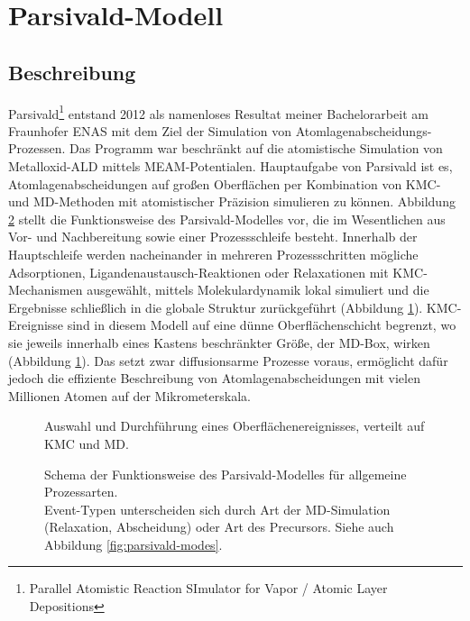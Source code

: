 \section{Parsivald-Modell}
\label{parsivald}


\subsection{Beschreibung}

Parsivald\footnote{Parallel Atomistic Reaction SImulator for Vapor / Atomic Layer Depositions} entstand 2012 als namenloses Resultat meiner Bachelorarbeit\cite{lorenz_entwicklung_2012} am Fraunhofer ENAS mit dem Ziel der Simulation von Atom\-lagen\-abscheidungs-Prozessen.
Das Programm war beschränkt auf die atomistische Simulation von Metall\-oxid-ALD mittels MEAM-Potentialen.
Hauptaufgabe von Parsivald ist es, Atomlagenabscheidungen auf großen Oberflächen per Kombination von KMC- und MD-Methoden mit atomistischer Präzision simulieren zu können.
Abbildung \ref{fig:parsivald-stephierarchy} stellt die Funktionsweise des Parsivald-Modelles vor, die im Wesentlichen aus Vor- und Nachbereitung sowie einer Prozessschleife besteht.
Innerhalb der Hauptschleife werden nacheinander in mehreren Prozessschritten mögliche Adsorptionen, Ligandenaustausch-Reaktionen oder Relaxationen mit KMC-Mechanismen ausgewählt, mittels Molekulardynamik lokal simuliert und die Ergebnisse schließlich in die globale Struktur zurückgeführt (Abbildung \ref{fig:parsivald-schema}).
KMC-Ereignisse sind in diesem Modell auf eine dünne Oberflächenschicht begrenzt, wo sie jeweils innerhalb eines Kastens beschränkter Größe, der MD-Box, wirken (Abbildung \ref{fig:parsivald-schema}).
Das setzt zwar diffusionsarme Prozesse voraus, ermöglicht dafür jedoch die effiziente Beschreibung von Atomlagenabscheidungen mit vielen Millionen Atomen auf der Mikrometerskala.

\begin{figure}
  \centering
  \def\svgwidth{\textwidth}
  
  \caption[Parsivald-Schema]{
    Auswahl und Durchführung eines Oberflächenereignisses, verteilt auf KMC und MD.
  }
  \label{fig:parsivald-schema}
\end{figure}

\begin{figure}
  \centering
  \def\svgwidth{\textwidth}
  
  \caption[Parsivald-Funktionsweise asd]{
    Schema der Funktionsweise des Parsivald-Modelles für allgemeine Prozessarten.
    \\
    Event-Typen unterscheiden sich durch Art der MD-Simulation (Relaxation, Abscheidung) oder Art des Precursors.
    Siehe auch Abbildung \ref{fig:parsivald-modes}.
  }
  \label{fig:parsivald-stephierarchy}
\end{figure}

